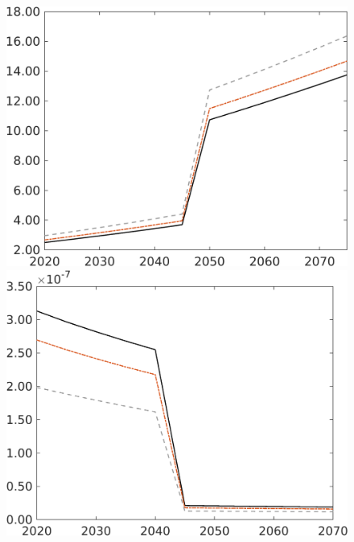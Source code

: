 \begin{figure}[h!!!]
\begin{minipage}[]{0.32\textwidth}
\end{minipage}
	\begin{minipage}[]{0.32\textwidth}
		\includegraphics[width=1\textwidth]{../../codding_model/own_basedOnFried/optimalPol_010922_revision/figures/all_13Sept22/CompRed_Taul0_GFF_spillover0_knspil0_nsk0_xgr0_sep0_LFlimit1_emsbase0_countec0_GovRev0_etaa0.79_lgd0.png}
	\end{minipage}
	\begin{minipage}[]{0.32\textwidth}
		\includegraphics[width=1\textwidth]{../../codding_model/own_basedOnFried/optimalPol_010922_revision/figures/all_13Sept22/CompRed_Taul0_gAf_spillover0_knspil0_nsk0_xgr0_sep0_LFlimit1_emsbase0_countec0_GovRev0_etaa0.79_lgd0.png}

\end{minipage}
\end{figure}
